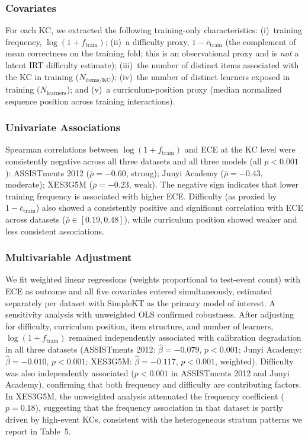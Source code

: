 \subsubsection*{Covariates}
For each KC, we extracted the following training-only characteristics: (i)~training frequency, $\log(1 + f_{\text{train}})$; (ii)~a difficulty proxy, $1 - \bar{c}_{\text{train}}$ (the complement of mean correctness on the training fold; this is an observational proxy and is \emph{not} a latent IRT difficulty estimate); (iii)~the number of distinct items associated with the KC in training ($N_{\text{items/KC}}$); (iv)~the number of distinct learners exposed in training ($N_{\text{learners}}$); and (v)~a curriculum-position proxy (median normalized sequence position across training interactions).

\subsubsection*{Univariate Associations}
Spearman correlations between $\log(1 + f_{\text{train}})$ and ECE at the KC level were consistently negative across all three datasets and all three models (all $p < 0.001$): ASSISTments 2012 ($\bar{\rho} = -0.60$, strong); Junyi Academy ($\bar{\rho} = -0.43$, moderate); XES3G5M ($\bar{\rho} = -0.23$, weak). The negative sign indicates that lower training frequency is associated with higher ECE. Difficulty (as proxied by $1 - \bar{c}_{\text{train}}$) also showed a consistently positive and significant correlation with ECE across datasets ($\bar{\rho} \in [0.19, 0.48]$), while curriculum position showed weaker and less consistent associations.

\subsubsection*{Multivariable Adjustment}
We fit weighted linear regressions (weights proportional to test-event count) with ECE as outcome and all five covariates entered simultaneously, estimated separately per dataset with SimpleKT as the primary model of interest. A sensitivity analysis with unweighted OLS confirmed robustness. After adjusting for difficulty, curriculum position, item structure, and number of learners, $\log(1 + f_{\text{train}})$ remained independently associated with calibration degradation in all three datasets (ASSISTments 2012: $\hat{\beta} = -0.079$, $p < 0.001$; Junyi Academy: $\hat{\beta} = -0.010$, $p < 0.001$; XES3G5M: $\hat{\beta} = -0.117$, $p < 0.001$, weighted). Difficulty was also independently associated ($p < 0.001$ in ASSISTments 2012 and Junyi Academy), confirming that both frequency and difficulty are contributing factors. In XES3G5M, the unweighted analysis attenuated the frequency coefficient ($p = 0.18$), suggesting that the frequency association in that dataset is partly driven by high-event KCs, consistent with the heterogeneous stratum patterns we report in Table~5.

